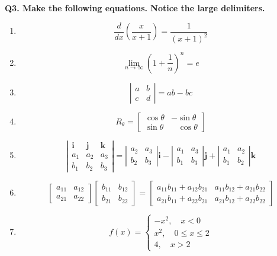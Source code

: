 \documentclass{article}
\begin{document}
	\noindent \textbf{Q3. Make the following equations. Notice the large delimiters.}
	\begin{enumerate}
		\item \[\frac{d}{dx} \left( \frac{x}{x+1} \right) = \frac{1}{(x+1)^2}\]
		\item \[\lim\limits_{n \to \infty} \left( 1+\frac{1}{n} \right)^n = e\]
		\item \[ \left| \begin{array}{cc}
			a & b \\ c & d 
		\end{array} \right| = ab-bc \]
		\item \[ R_\theta  = \left[ \begin{array}{cc}
			\cos \theta & -\sin \theta \\ 
			\sin \theta & \; \; \; \cos \theta
		\end{array} \right] \]
		\item \[ 
		\left| \begin{array}{ccc}
			\mathbf{i} & \mathbf{j} & \mathbf{k} \\ 
			a_1 & a_2 & a_3 \\ b_1 & b_2 & b_3
		\end{array} \right| = \left| \begin{array}{cc} 
			a_2 & a_3 \\ b_2 & b_3
		\end{array} \right| \mathbf{i} - \left| \begin{array}{cc} 
			a_1 & a_3 \\ b_1 & b_3
		\end{array} \right| \mathbf{j} + \left| \begin{array}{cc} 
			a_1 & a_2 \\ b_1 & b_2
		\end{array} \right| \mathbf{k}
		\]
		\item \[ \left[ \begin{array}{cc}
			a_{11} & a_{12} \\ a_{21} & a_{22} 
		\end{array} \right] \left[ \begin{array}{cc}
			b_{11} & b_{12} \\ b_{21} & b_{22} 
		\end{array} \right] = \left[ \begin{array}{cc}
			a_{11}b_{11}+a_{12}b_{21} & a_{11}b_{12}+a_{21}b_{22} \\
			a_{21}b_{11}+a_{22}b_{21} & a_{21}b_{12}+a_{22}b_{22} 
		\end{array} \right] \]
		\item \[ f(x) = \begin{cases}
			-x^2, \quad x<0 \\ 
			x^2, \quad 0 \leq x \leq 2 \\
			4, \quad x>2
		\end{cases} \]
	\end{enumerate}
	
\end{document}
